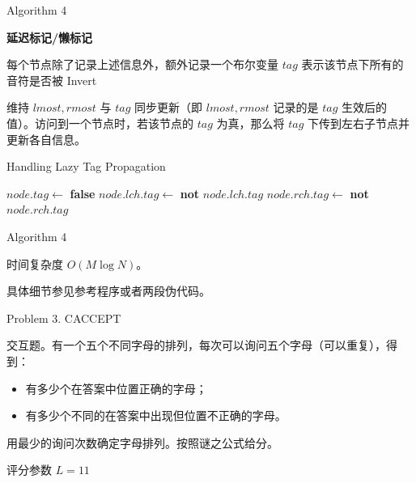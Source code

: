 \documentclass[UTF8]{beamer}
\begin{document}
\begin{frame}{Algorithm 4}

\textbf{延迟标记/懒标记}

每个节点除了记录上述信息外，额外记录一个布尔变量 $tag$%
表示该节点下所有的音符是否被 Invert

维持 $lmost, rmost$ 与 $tag$ 同步更新（即 $lmost, rmost$%
记录的是 $tag$ 生效后的值）。访问到一个节点时，若该节点的%
$tag$ 为真，那么将 $tag$ 下传到左右子节点并更新各自信息。

\end{frame}

\begin{frame}{Handling Lazy Tag Propagation}

\begin{algorithm}[H]
\begin{algorithmic}[1]
            \State \Return
        \EndIf
        \State $node.tag \gets$ \textbf{false}
        \State $node.lch.tag \gets$ \textbf{not} $node.lch.tag$
        \State $node.rch.tag \gets$ \textbf{not} $node.rch.tag$
        \State {}
        \State {}
        \State {}
        \State {}
    \EndFunction
\end{algorithmic}
\caption{}
\label{alg:seq}
\end{algorithm}

\end{frame}

\begin{frame}{Algorithm 4}

时间复杂度 $O(M \log N)$。

具体细节参见参考程序或者两段伪代码。

\end{frame}

\begin{frame}{Problem 3. CACCEPT}

 \newline\newline

交互题。有一个五个不同字母的排列，每次可以询问五个字母（可以重复），得到：
\begin{itemize}
    \item 有多少个在答案中位置正确的字母；
    \item 有多少个不同的在答案中出现但位置不正确的字母。
\end{itemize}

用最少的询问次数确定字母排列。按照谜之公式给分。

\pause
评分参数 $L = 11$ 

\end{frame}
\end{document}
